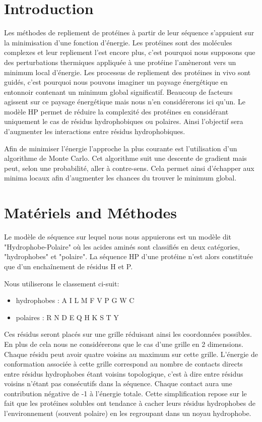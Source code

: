 \onehalfspacing

\section{Introduction}

Les méthodes de repliement de protéines à partir de leur séquence s'appuient sur la minimisation d'une fonction d'énergie. Les protéines sont des molécules complexes et leur repliement l'est encore plus, c'est pourquoi nous supposons que des perturbations thermiques appliquée à une protéine l'amèneront vers un minimum local d'énergie. Les processus de repliement des protéines in vivo sont guidés, c'est pourquoi nous pouvons imaginer un paysage énergétique en entonnoir contenant un minimum global significatif. Beaucoup de facteurs agissent sur ce paysage énergétique mais nous n'en considérerons ici qu'un. Le modèle HP permet de réduire la complexité des protéines en considérant uniquement le cas de résidus hydrophobiques ou polaires. Ainsi l'objectif sera d'augmenter les interactions entre résidus hydrophobiques.

Afin de minimiser l'énergie l'approche la plus courante est l'utilisation d'un algorithme de Monte Carlo. Cet algorithme suit une descente de gradient mais peut, selon une probabilité, aller à contre-sens. Cela permet ainsi d'échapper aux minima locaux afin d'augmenter les chances du trouver le minimum global. 

\section{Matériels and Méthodes}

Le modèle de séquence sur lequel nous nous appuierons est un modèle dit "Hydrophobe-Polaire" où les acides aminés sont classifiés en deux catégories, "hydrophobes" et "polaire". La séquence HP d'une protéine n'est alors constituée que d'un enchaînement de résidus H et P.

Nous utiliserons le classement ci-suit:
\begin{itemize}
    \item hydrophobes : A I L M F V P G W C
    \item polaires : R N D E Q H K S T Y
\end{itemize}

Ces résidus seront placés sur une grille réduisant ainsi les coordonnées possibles. En plus de cela nous ne considérerons que le cas d'une grille en 2 dimensions. Chaque résidu peut avoir quatre voisins au maximum sur cette grille. L'énergie de conformation associée à cette grille correspond au nombre de contacts directs entre résidus hydrophobes étant voisins topologique, c'est à dire entre résidus voisins n'étant pas consécutifs dans la séquence. Chaque contact aura une contribution négative de -1 à l'énergie totale. Cette simplification repose sur le fait que les protéines solubles ont tendance à cacher leurs résidus hydrophobes de l'environnement (souvent polaire) en les regroupant dans un noyau hydrophobe.

